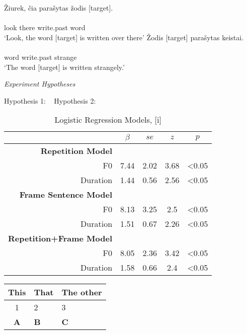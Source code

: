 \documentclass{article}
\begin{document}
\begin{exe}
\ex
\begin{xlist}
\ex\label{ex1a}
\glll \v{Z}iurek, \v{c}ia para\v{s}ytas \v{z}odis [target]. \\
    {} \\
look there write.past word {} \\
\glt `Look, the word [target] is written over there'
\vspace{1cm}
\ex\label{ex1b}
\glll \v{Z}odis [target] para\v{s}ytas keistai. \\
 {}   \\
word {} write.past strange \\
\glt `The word [target] is written strangely.'
\end{xlist}
\end{exe}



\vspace{2cm}
\begin{exe}
\ex \textit{Experiment Hypotheses}\
\begin{xlist}
\ex\label{ex1a} Hypothesis 1: \
\ex\label{ex1b} Hypothesis 2: \
\end{xlist}
\end{exe}

\begin{table}
\begin{center}
\caption{Logistic Regression Models, [i]}
\begin{tabular}{r|cccc}
& $\beta$ & $se$ & $z$ & $p$ \\
\hline \
\textbf{Repetition Model} \\
F0 & 7.44 & 2.02 & 3.68 & <0.05 \\
Duration & 1.44 & 0.56 & 2.56 & <0.05 \\
\hline
\textbf{Frame Sentence Model} \\
F0 & 8.13 & 3.25 & 2.5 & <0.05 \\
Duration & 1.51 & 0.67 & 2.26 & <0.05 \\
\hline
\textbf{Repetition+Frame Model} \\
F0 & 8.05 & 2.36 & 3.42 & <0.05 \\
Duration & 1.58 & 0.66 & 2.4 & <0.05 \\
\end{tabular}
\end{center}
\end{table}

\begin{tabular}{|c|l|l|}
\hline
This & That & The other \\
\hline
1 & 2 & 3 \\
\hline
\textbf{A} & \textbf{B} & \textbf{C} \\
\hline
\end{tabular}
\end{document}
